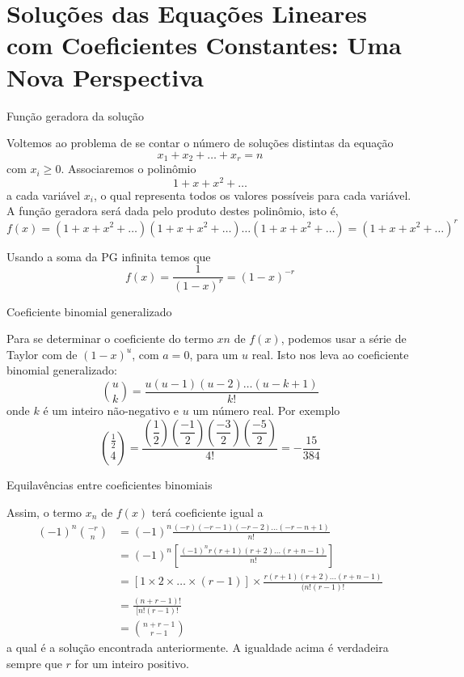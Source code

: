 \section*{Soluções das Equações Lineares com Coeficientes Constantes: Uma Nova Perspectiva}

\begin{frame}[fragile]{Função geradora da solução}

Voltemos ao problema de se contar o número de soluções distintas da equação
\[
        x_1 + x_2 + \ldots + x_r = n
\]
com $x_i \geq 0$. Associaremos o polinômio
\[
        1 + x + x^2 + \ldots
\]
a cada variável $x_i$, o qual representa todos os valores possíveis para cada variável. A função
geradora será dada pelo produto destes polinômio, isto é,
\[
        f(x) = (1 + x + x^2 + \ldots)(1 + x + x^2 + \ldots) \ldots (1 + x + x^2 + \ldots)
             = (1 + x + x^2 + \ldots)^r
\]

Usando a soma da PG infinita temos que
\[
        f(x) = \frac{1}{(1 - x)^r} = (1 - x)^{-r}
\]

\end{frame}

\begin{frame}[fragile]{Coeficiente binomial generalizado}

Para se determinar o coeficiente do termo $xn$ de $f(x)$, podemos usar a série de Taylor com 
de $(1 - x)^u$, com $ a=0$, para um $u$ real. Isto nos leva ao coeficiente binomial generalizado:
\[
        \binom{u}{k} = \frac{u(u - 1)(u - 2) \ldots (u - k + 1)}{k!}
\]
onde $k$ é um inteiro não-negativo e $u$ um número real. Por exemplo
\[
        \binom{\frac{1}{2}}{4} = \dfrac{\left(\dfrac{1}{2}\right)\left(\dfrac{-1}{2}\right)\left(\dfrac{-3}{2}\right)\left(\dfrac{-5}{2}\right)}{4!} = -\frac{15}{384}
\]
\end{frame}

\begin{frame}[fragile]{Equilavências entre coeficientes binomiais}

Assim, o termo $x_n$ de $f(x)$ terá coeficiente igual a
\[
\begin{split}
        (-1)^n \binom{-r}{n} &= (-1)^n \frac{(-r)(-r - 1)(-r - 2) \ldots (-r - n + 1)}{n!} \\
                             &= (-1)^n \left[\frac{(-1)^n r(r + 1)(r + 2) \ldots (r + n - 1)}{n!}\right] \\
                             &= \left[1 \times 2 \times \ldots \times (r - 1)\right]\times \frac{r(r + 1)(r + 2) \ldots (r + n - 1)}{(n!(r - 1)!} \\
                             &= \frac{(n + r - 1)!}{[n!(r - 1)!} \\
                             &= \binom{n + r - 1}{r - 1}
\end{split}
\]
a qual é a solução encontrada anteriormente. A igualdade acima é verdadeira sempre que $r$ for
um inteiro positivo.

\end{frame}


